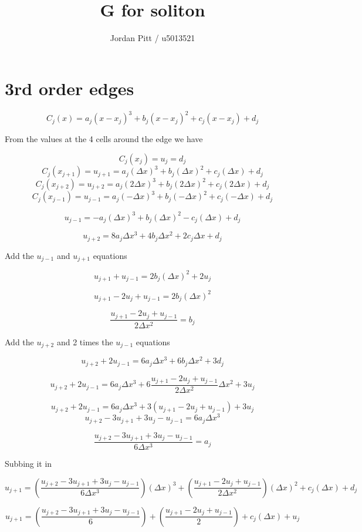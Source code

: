 \documentclass[12pt]{article}
\begin{document}
\title{G for soliton}
\author{Jordan Pitt / u5013521}

\section{3rd order edges}

\[C_j (x) = a_j (x - x_j)^3 + b_j(x - x_j)^2 + c_j (x - x_j) + d_j \]

From the values at the 4 cells around the edge we have

\[C_j (x_j) = u_j =  d_j \]
\[C_j (x_{j+1}) = u_{j+1} =  a_j (\Delta x)^3 + b_j(\Delta x)^2 + c_j (\Delta x) + d_j \]
\[C_j (x_{j+2}) = u_{j+2} =  a_j (2\Delta x)^3 + b_j(2\Delta x)^2 + c_j (2\Delta x) + d_j \]
\[C_j (x_{j-1}) = u_{j-1} =  a_j (-\Delta x)^3 + b_j(-\Delta x)^2 + c_j (-\Delta x) + d_j \]

\[u_{j-1} = - a_j (\Delta x)^3 + b_j(\Delta x)^2 - c_j (\Delta x) + d_j \]

\[u_{j+2} =  8a_j \Delta x^3 + 4b_j\Delta x^2 + 2c_j\Delta x + d_j \]

Add the $u_{j-1}$ and $u_{j+1}$ equations

\[u_{j+1} + u_{j-1}  =  2b_j(\Delta x)^2  + 2u_j\]

\[u_{j+1} - 2u_j + u_{j-1}  =  2b_j(\Delta x)^2 \]

\[ \frac{u_{j+1} - 2u_j + u_{j-1}}{2 \Delta x^2 }  =  b_j \]

Add the $u_{j+2}$ and 2 times the $u_{j-1}$ equations

\[u_{j+2} + 2u_{j-1} =  6a_j \Delta x^3 + 6b_j\Delta x^2  + 3d_j \]

\[u_{j+2} + 2u_{j-1}  =  6a_j \Delta x^3 + 6\frac{u_{j+1} - 2u_j + u_{j-1}}{2 \Delta x^2 }\Delta x^2  + 3u_j \]

\[u_{j+2} + 2u_{j-1} =  6a_j \Delta x^3 + 3\left(u_{j+1} - 2u_j + u_{j-1}\right) + 3u_j \]
\[u_{j+2} - 3u_{j+1} + 3u_j - u_{j-1}  =  6a_j \Delta x^3  \]

\[\frac{u_{j+2} - 3u_{j+1} + 3u_j - u_{j-1}}{6 \Delta x^3} = a_j\]

Subbing it in

\[u_{j+1} =  \left(\frac{u_{j+2} - 3u_{j+1} + 3u_j - u_{j-1}}{6 \Delta x^3}\right) (\Delta x)^3 + \left(\frac{u_{j+1} - 2u_j + u_{j-1}}{2 \Delta x^2 }\right)(\Delta x)^2 + c_j (\Delta x) + d_j \]

\[u_{j+1} =  \left(\frac{u_{j+2} - 3u_{j+1} + 3u_j - u_{j-1}}{6}\right) + \left(\frac{u_{j+1} - 2u_j + u_{j-1}}{2 }\right) + c_j (\Delta x) + u_j \]
\end{document}

